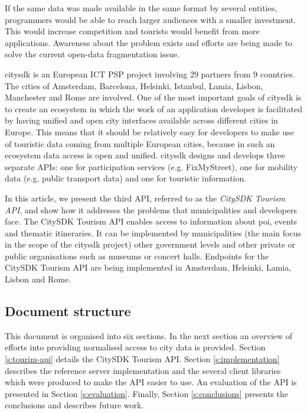 \documentclass[times]{ettauth}
\begin{document}
If the same data was made available in the same format by several entities, programmers would be able to reach larger audiences with a smaller investment. 
This would increase competition and tourists would benefit from more applications.
Awareness about the problem exists and efforts are being made to solve the current open-data fragmentation issue.

\ac{citysdk} is an European ICT PSP project involving 29 partners from 9 countries.
The cities of Amsterdam, Barcelona, Helsinki, Istanbul, Lamia, Lisbon, Manchester and Rome are involved.
One of the most important goals of \ac{citysdk} is to create an ecosystem in which the work of an application developer is facilitated by having unified and open city interfaces available across different cities in Europe. 
This means that it should be relatively easy for developers to make use of touristic data coming from multiple European cities, because in such an ecosystem data access is open and unified. 
\ac{citysdk} designs and develops three separate APIs: one for participation services (e.g. FixMyStreet), one for mobility data (e.g. public transport data) and one for touristic information. 
 
In this article, we present the third API, referred to as the \emph{CitySDK Tourism API}, and show how it addresses the problems that municipalities and developers face. 
The CitySDK Tourism API enables access to information about \ac{poi}, events and thematic itineraries.
It can be implemented by municipalities (the main focus in the scope of the \ac{citysdk} project) other government levels and other private or public organisations such as museums or concert halls.
Endpoints for the CitySDK Tourism API are being implemented in Amsterdam, Helsinki, Lamia, Lisbon and Rome.

\subsection{Document structure}
\label{s:structure}
This document is organised into six sections.
In the next section an overview of efforts into providing normalised access to city data is provided.
Section \ref{s:tourim-api} details the CitySDK Tourism API.
Section \ref{s:implementation} describes the reference server implementation and the several client libraries which were produced to make the API easier to use.
An evaluation of the API is presented in  Section \ref{s:evaluation}. 
Finally, Section \ref{s:conclusions} presents the conclusions and describes future work.
\end{document}
